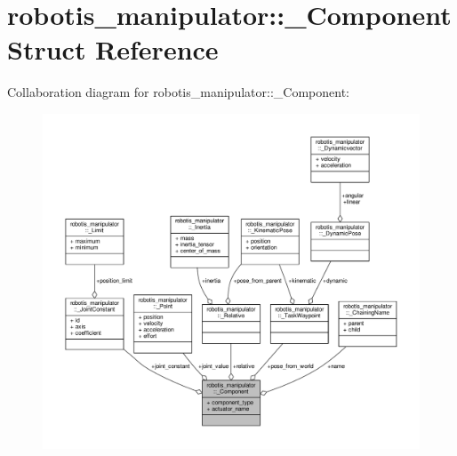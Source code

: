 \hypertarget{structrobotis__manipulator_1_1___component}{}\section{robotis\+\_\+manipulator\+:\+:\+\_\+\+Component Struct Reference}
\label{structrobotis__manipulator_1_1___component}


Collaboration diagram for robotis\+\_\+manipulator\+:\+:\+\_\+\+Component\+:
\nopagebreak
\begin{figure}[H]
\begin{center}
\leavevmode
\includegraphics[width=350pt]{structrobotis__manipulator_1_1___component__coll__graph}
\end{center}
\end{figure}
